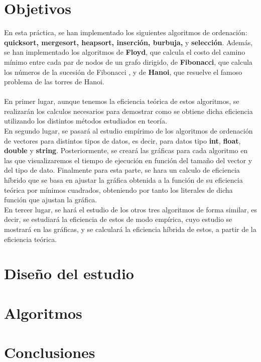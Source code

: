 \documentclass[11pt]{article}
\newcommand{\negrita}[1]{\textbf{#1}}
\begin{document}
\section{Objetivos}
    En esta práctica, se han implementado los siguientes algoritmos de ordenación: \negrita{quicksort, mergesort, heapsort, inserción, burbuja,}
    y \negrita{selección}. Además, se han implementado los algoritmos de \negrita{Floyd}, que calcula el costo del camino mínimo entre cada par de nodos 
    de un grafo dirigido, de \negrita{Fibonacci}, que calcula los números de la sucesión de Fibonacci , y de \negrita{Hanoi}, que resuelve el famoso 
    problema de las torres de Hanoi. \\ \\
    En primer lugar, aunque tenemos la eficiencia teórica de estos algoritmos, se realizarán los calculos necesarios para demostrar
    como se obtiene dicha eficiencia utilizando los distintos métodos estudiados en teoría. \\
    En segundo lugar, se pasará al estudio empírimo de los algoritmos de ordenación de vectores para distintos tipos de datos, es decir, 
    para datos tipo \negrita{int}, \negrita{float}, \negrita{double} y \negrita{string}. Posteriormente, se creará las gráficas para
    cada algoritmo en las que visualizaremos el tiempo de ejecución en función del tamaño del vector y del tipo de dato. Finalmente 
    para esta parte, se hara un calculo de eficiencia híbrido que se basa en ajustar la gráfica obtenida a la función de su eficiencia
    teórica por mínimos cuadrados, obteniendo por tanto los literales de dicha función que ajustan la gráfica.\\
    En tercer lugar, se hará el estudio de los otros tres algoritmos de forma similar, es decir, se estudiará la eficiencia
    de estos de modo empírica, cuyo estudio se mostrará en las gráficas, y se calculará la eficiencia híbrida de estos, a partir
    de la eficiencia teórica.\\ 

\section{Diseño del estudio}
    \newcommand{\mivar}{ordenación de vectores quicksort}
    
\section{Algoritmos}
\section{Conclusiones}
\end{document}
